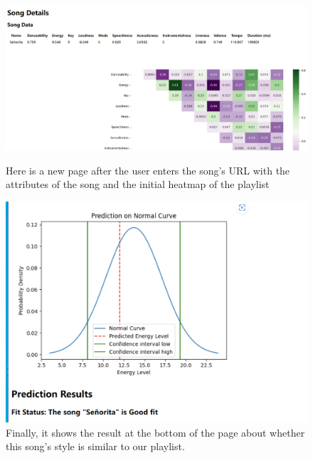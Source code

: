 \documentclass[titlepage]{article}
\begin{document}
\begin{figure}[h]
\centering
\includegraphics[width=1\textwidth]{4.png}
\caption{Here is a new page after the user enters the song's URL with the attributes of the song and the initial heatmap of the playlist}


\includegraphics[width=1\textwidth]{5.png}
\caption{Finally, it shows the result at the bottom of the page about whether this song's style is similar to our playlist.}
\label{fig:enter-label}
\end{figure}
\end{document}

